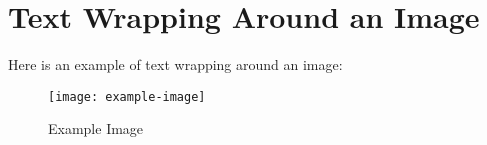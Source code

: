 \documentclass[a4paper,12pt]{article}
\begin{document}
\section*{Text Wrapping Around an Image}

Here is an example of text wrapping around an image:

\begin{wrapfigure}{r}{0.4\textwidth} %
    \texttt{[image: example-image]} %
    \caption{Example Image} %
\end{wrapfigure}

\lipsum[1-2] %
\end{document}
